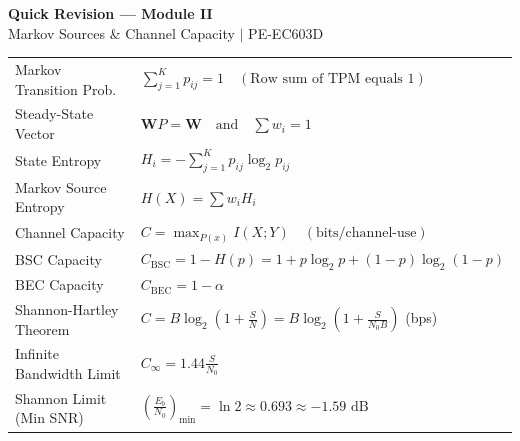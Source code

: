 \documentclass[12pt,a4paper]{article}
\renewcommand{\arraystretch}{1.45}
\begin{document}
\newpage
\begin{center}
  {\large\bfseries\color{myred} Quick Revision --- Module II}\\[3pt]
  {\small\color{mydark} Markov Sources \& Channel Capacity $|$ PE-EC603D}
\end{center}
\noindent{\color{myred}\rule{\linewidth}{1.2pt}}
\vspace{4pt}

\begin{tcolorbox}[formulabox, title={\textbf{Key Formulas at a Glance}}]
\renewcommand{\arraystretch}{1.3}
\begin{tabularx}{\linewidth}{B{4.5cm} X}
Markov Transition Prob.  & $\sum_{j=1}^K p_{ij} = 1 \quad (\text{Row sum of TPM equals 1})$ \\[4pt]
Steady-State Vector     & $\mathbf{W}P = \mathbf{W} \quad \text{and} \quad \sum w_i = 1$ \\[4pt]
State Entropy           & $H_i = -\sum_{j=1}^K p_{ij} \log_2 p_{ij}$ \\[4pt]
Markov Source Entropy   & $H(X) = \sum w_i H_i$ \\[4pt]
Channel Capacity        & $C = \max_{P(x)} I(X;Y) \quad (\text{bits/channel-use})$ \\[4pt]
BSC Capacity            & $C_{\text{BSC}} = 1 - H(p) = 1 + p\log_2 p + (1-p)\log_2(1-p)$ \\[4pt]
BEC Capacity            & $C_{\text{BEC}} = 1 - \alpha$ \\[4pt]
Shannon-Hartley Theorem & $C = B \log_2 \left( 1 + \frac{S}{N} \right) = B \log_2 \left( 1 + \frac{S}{N_0 B} \right)$ (bps) \\[4pt]
Infinite Bandwidth Limit & $C_{\infty} = 1.44 \frac{S}{N_0}$ \\[4pt]
Shannon Limit (Min SNR) & $\left(\frac{E_b}{N_0}\right)_{\text{min}} = \ln 2 \approx 0.693 \approx -1.59 \text{ dB}$
\end{tabularx}
\end{tcolorbox}
\end{document}

